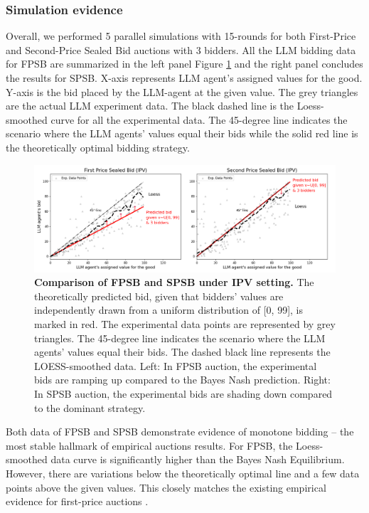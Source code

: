 \documentclass{article} %
\begin{document}
\subsubsection{Simulation evidence}
Overall, we performed 5 parallel simulations with 15-rounds for both First-Price and Second-Price Sealed Bid auctions with 3 bidders.
All the LLM bidding data for FPSB are summarized in the left panel Figure \ref{fig:fpsb-plan} and the right panel concludes the results for SPSB.
X-axis represents LLM agent's assigned values for the good. 
Y-axis is the bid placed by the LLM-agent at the given value.
The grey triangles are the actual LLM experiment data. 
The black dashed line is the Loess-smoothed curve for all the experimental data. 
The 45-degree line indicates
the scenario where the LLM agents’ values equal their bids while the solid red line is the theoretically optimal bidding strategy.

\begin{figure}[h]
    \centering \includegraphics[width=\linewidth]{Figs/ipv.png}
    \caption{\textbf{ Comparison of FPSB and SPSB under IPV setting.} The theoretically predicted bid, given that bidders' values are independently drawn from a uniform distribution of [0, 99], is marked in red. The experimental data points are represented by grey triangles. The 45-degree line indicates the scenario where the LLM agents' values equal their bids. The dashed black line represents the LOESS-smoothed data. Left: In FPSB auction, the experimental bids are ramping up compared to the Bayes Nash prediction. Right: In SPSB auction, the experimental bids are shading down compared to the dominant strategy.}
    \label{fig:fpsb-plan}

\end{figure}

Both data of FPSB and SPSB demonstrate evidence of monotone bidding -- the most stable hallmark of empirical auctions results.
For FPSB, the Loess-smoothed data curve is significantly higher than the Bayes Nash Equilibrium. However, there are variations below the theoretically optimal line and a few data points above the given values.
This closely matches the existing empirical evidence for first-price auctions \citep{cox1988theory}. 
\end{document}
